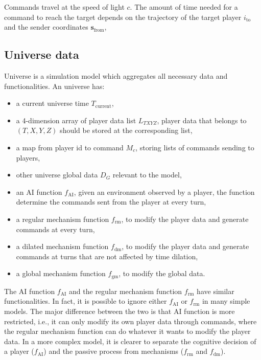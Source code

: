 \documentclass{article}
\begin{document}
Commands travel at the speed of light $c$.
The amount of time needed for a command to reach the target depends on the 
trajectory of the target player $i_{\textrm{to}}$ and the sender coordinates $\textbf{s}_{\textrm{from}}$,

\subsection{Universe data}

Universe is a simulation model which aggregates all necessary data and functionalities.
An universe has:
\begin{itemize}
  \item a current universe time $T_{\textrm{current}}$,
  \item a 4-dimension array of player data list $L_{TXYZ}$, player data that belongs to
        $(T, X, Y, Z)$ should be stored at the corresponding list,
  \item a map from player id to command $M_c$, storing lists of commands sending to players,
  \item other universe global data $D_G$ relevant to the model,
  \item an AI function $f_{\textrm{AI}}$, given an environment observed by a player, the function
        determine the commands sent from the player at every turn,
  \item a regular mechanism function $f_{\textrm{rm}}$, to modify the player data and generate commands 
        at every turn,
  \item a dilated mechanism function $f_{\textrm{dm}}$, to modify the player data and generate commands 
        at turns that are not affected by time dilation,
  \item a global mechanism function $f_{\textrm{gm}}$, to modify the global data.
\end{itemize}

The AI function $f_{\textrm{AI}}$ and the regular mechanism function $f_{\textrm{rm}}$ have similar
functionalities. 
In fact, it is possible to ignore either $f_{\textrm{AI}}$ or $f_{\textrm{rm}}$
in many simple models.
The major difference between the two is that AI function is more restricted, i.e., 
it can only modify its own player data through commands, 
where the regular mechanism function can do whatever it wants to modify the player data.
In a more complex model, it is clearer to separate the cognitive decision of a player ($f_{\textrm{AI}}$)
and the passive process from mechanisms ($f_{\textrm{rm}}$ and $f_{\textrm{dm}}$).
\end{document}
